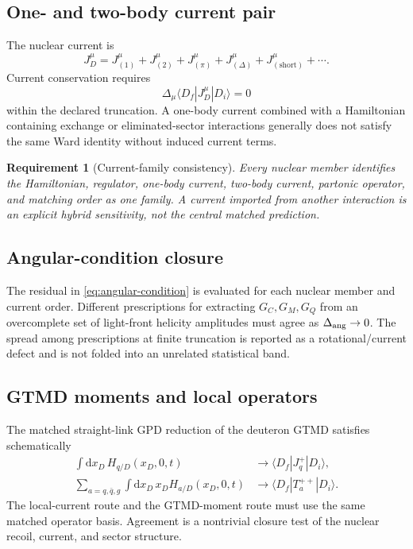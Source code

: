\documentclass[11pt]{article}
\newtheorem{requirement}[definition]{Requirement}
\newcommand{\dd}{\mathrm{d}}
\newcommand{\shortd}{\mathrm{short}}
\begin{document}
\subsection{One- and two-body current pair}

The nuclear current is
\begin{equation}
 J_D^\mu
 =J_{(1)}^\mu+J_{(2)}^\mu+J_{(\pi)}^\mu
 +J_{(\Delta)}^\mu+J_{(\shortd)}^\mu+\cdots.
\label{eq:nuclear-current-expansion}
\end{equation}
Current conservation requires
\begin{equation}
 \Delta_\mu\langle D_f|J_D^\mu|D_i\rangle=0
\label{eq:deuteron-current-conservation}
\end{equation}
within the declared truncation.  A one-body current combined with a
Hamiltonian containing exchange or eliminated-sector interactions generally
does not satisfy the same Ward identity without induced current terms.

\begin{requirement}[Current-family consistency]
\label{req:current-family-consistency}
Every nuclear member identifies the Hamiltonian, regulator, one-body current,
two-body current, partonic operator, and matching order as one family.  A
current imported from another interaction is an explicit hybrid sensitivity,
not the central matched prediction.
\end{requirement}

\subsection{Angular-condition closure}

The residual in \cref{eq:angular-condition} is evaluated for each nuclear
member and current order.  Different prescriptions for extracting
\(G_C,G_M,G_Q\) from an overcomplete set of light-front helicity amplitudes
must agree as \(\Delta_{\rm ang}\to0\).  The spread among prescriptions at
finite truncation is reported as a rotational/current defect and is not
folded into an unrelated statistical band.

\subsection{GTMD moments and local operators}

The matched straight-link GPD reduction of the deuteron GTMD satisfies
schematically
\begin{align}
 \int\dd x_D\,H_{q/D}(x_D,0,t)
 &\longrightarrow
 \langle D_f|J_q^+|D_i\rangle,
\label{eq:vector-current-moment}\\
 \sum_{a=q,\bar q,g}
 \int\dd x_D\,x_D H_{a/D}(x_D,0,t)
 &\longrightarrow
 \langle D_f|T_a^{++}|D_i\rangle.
\label{eq:emt-moment}
\end{align}
The local-current route and the GTMD-moment route must use the same matched
operator basis.  Agreement is a nontrivial closure test of the nuclear
recoil, current, and sector structure.
\end{document}
